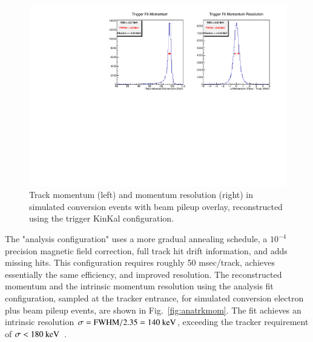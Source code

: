\begin{figure}[tbp]
 \centering
 \includegraphics[width=\textwidth]{figures/KKTTmom.pdf}%
 \caption{Track momentum (left) and momentum resolution (right) in simulated conversion events with beam pileup overlay, reconstructed using the trigger KinKal configuration.}
 \label{fig:trigtrkmom}
\end{figure}

The "analysis configuration" uses a more gradual annealing schedule, a $10^{-4}$ precision magnetic field correction, full track hit drift information, and adds missing hits. This configuration requires roughly 50 msec/track, achieves essentially the same efficiency, and improved resolution. The reconstructed momentum and the intrinsic momentum resolution using the analysis fit configuration, sampled at the tracker entrance, for simulated conversion electron plus beam pileup events, are shown in Fig.~\ref{fig:anatrkmom}. 
The fit achieves an intrinsic resolution $\sigma = \rm FWHM/2.35 = 140 ~\mbox{keV}$, exceeding the tracker requirement of $\sigma < 180 ~\mbox{keV}$~\cite{trackerreqs}.

